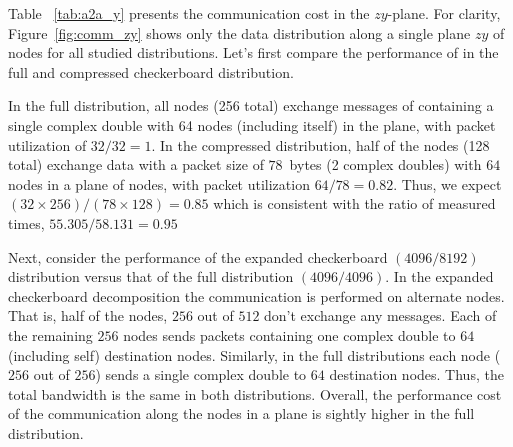 Table ~\ref{tab:a2a_y} presents the \alltoall communication cost in the
$zy$-plane. For clarity, Figure~\ref{fig:comm_zy} shows only the data
distribution along a single plane $zy$ of nodes for all studied
distributions.  Let's first compare the performance of \alltoall in the
full and compressed checkerboard distribution.

In the full distribution, all nodes (256 total) exchange messages
of containing a single complex double with 64 nodes (including itself) in the
 plane, with packet utilization of $32/32=1$.   
In the compressed distribution, half of the nodes (128 total)
exchange data with a packet size of $78$~bytes (2 complex doubles) with $64$ nodes
in a plane of nodes, with packet utilization $64/78=0.82$. 
Thus, we expect  $(32 \times 256)/(78 \times 128)=0.85$  
which is consistent with the ratio of measured times, $55.305/58.131=0.95$
 
Next, consider the performance of the expanded checkerboard
$(4096/8192)$ distribution versus that of the full distribution
$(4096/4096)$. In the expanded checkerboard decomposition the
communication is performed on alternate nodes.  That is, half of
the nodes, $256$ out of $512$ don't exchange any messages. Each of the 
remaining  $256$ nodes sends packets containing one complex double to
$64$ (including self) destination nodes. 
Similarly, in the full distributions each node ($256$ out of $256$) sends 
a single complex double to $64$ destination nodes. Thus, the total
bandwidth is the same in both distributions. 
Overall, the performance cost of the communication along the nodes in
a plane is sightly higher in the full distribution.

 
